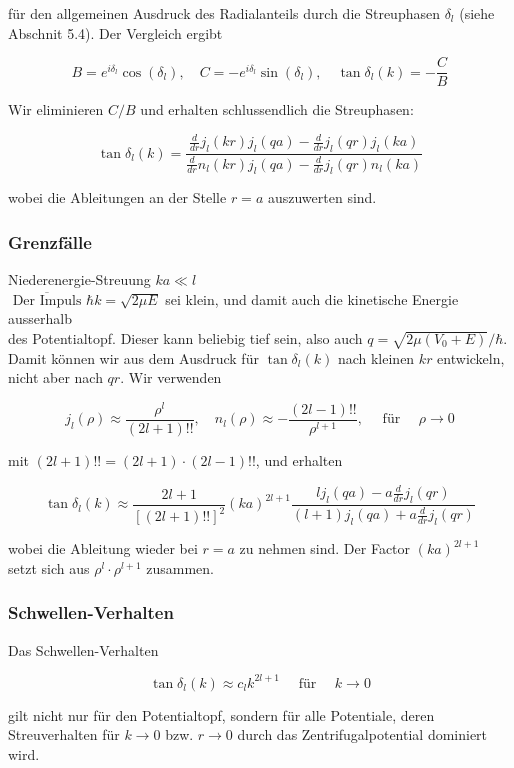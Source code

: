 \documentclass[10pt, letterpaper]{article}
\begin{document}
für den allgemeinen Ausdruck des Radialanteils durch die Streuphasen $\delta_{l}$ (siehe Abschnit 5.4). Der Vergleich ergibt

$$
B=e^{i \delta_{l}} \cos \left(\delta_{l}\right), \quad C=-e^{i \delta_{l}} \sin \left(\delta_{l}\right), \quad \tan \delta_{l}(k)=-\frac{C}{B}
$$

Wir eliminieren $C / B$ und erhalten schlussendlich die Streuphasen:

$$
\tan \delta_{l}(k)=\frac{\frac{d}{d r} j_{l}(k r) j_{l}(q a)-\frac{d}{d r} j_{l}(q r) j_{l}(k a)}{\frac{d}{d r} n_{l}(k r) j_{l}(q a)-\frac{d}{d r} j_{l}(q r) n_{l}(k a)}
$$

wobei die Ableitungen an der Stelle $r=a$ auszuwerten sind.

\subsubsection*{Grenzfälle}
Niederenergie-Streuung $k a \ll l$\\
$\overline{\text { Der Impuls }} \hbar k=\sqrt{2 \mu E}$ sei klein, und damit auch die kinetische Energie ausserhalb\\
des Potentialtopf. Dieser kann beliebig tief sein, also auch $q=\sqrt{2 \mu\left(V_{0}+E\right)} / \hbar$. Damit können wir aus dem Ausdruck für $\tan \delta_{l}(k)$ nach kleinen $k r$ entwickeln, nicht aber nach $q r$. Wir verwenden

$$
j_{l}(\rho) \approx \frac{\rho^{l}}{(2 l+1)!!}, \quad n_{l}(\rho) \approx-\frac{(2 l-1)!!}{\rho^{l+1}}, \quad \text { für } \quad \rho \rightarrow 0
$$

mit $(2 l+1)!!=(2 l+1) \cdot(2 l-1)!!$, und erhalten

$$
\tan \delta_{l}(k) \approx \frac{2 l+1}{[(2 l+1)!!]^{2}}(k a)^{2 l+1} \frac{l j_{l}(q a)-a \frac{d}{d r} j_{l}(q r)}{(l+1) j_{l}(q a)+a \frac{d}{d r} j_{l}(q r)}
$$

wobei die Ableitung wieder bei $r=a$ zu nehmen sind. Der Factor $(k a)^{2 l+1}$ setzt sich aus $\rho^{l} \cdot \rho^{l+1}$ zusammen.

\subsubsection*{Schwellen-Verhalten}
Das Schwellen-Verhalten

$$
\tan \delta_{l}(k) \approx c_{l} k^{2 l+1} \quad \text { für } \quad k \rightarrow 0
$$

gilt nicht nur für den Potentialtopf, sondern für alle Potentiale, deren Streuverhalten für $k \rightarrow 0$ bzw. $r \rightarrow 0$ durch das Zentrifugalpotential dominiert wird.
\end{document}
